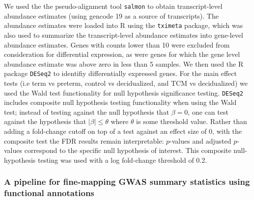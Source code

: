 We used the the pseudo-alignment tool \texttt{salmon}\cite{salmon} to obtain transcript-level abundance estimates (using gencode 19 as a source of transcripts). The abundance estimates were loaded into R 
using the \texttt{tximeta} package,\cite{tximeta} which was also used to summarize the transcript-level abundance estimates into gene-level abundance estimates.  Genes with counts lower than 10 were excluded from consideration
for differential expression, as were genes for which the gene level abundance estimate was above zero in less than 5 samples.  We then used the R package \texttt{DESeq2}\cite{DESeq2} to identifiy differentially expressed genes.  For the main effect tests (i.e term vs preterm, control vs decidualized, and TCM vs decidualized)  we used the Wald test functionality for null hypothesis significance testing.  \texttt{DESeq2} includes composite null hypothesis testing functionality when using the Wald test; instead of testing against the null hypothesis  that \(\beta =  0\), one can test against the hypothesis that \(\lvert \beta \rvert \leq \theta\) where \(\theta\) is some threshold value.  Rather than adding a fold-change cutoff on top of a test against an effect size of 0,  with the composite test the FDR results remain interpretable: $p$-values and adjusted $p$-values correspond to the specific null hypothesis of interest.  This composite null-hypothesis testing was used with a log fold-change threshold of 0.2.

\subsubsection{A pipeline for fine-mapping GWAS summary statistics using functional annotations}\label{sec:org24e3fbe}

